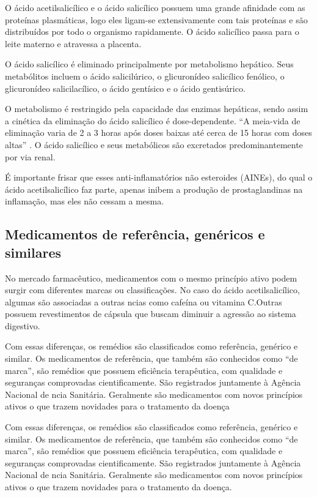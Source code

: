 O ácido acetilsalicílico e o ácido salicílico possuem uma grande afinidade com as proteínas plasmáticas,
logo eles ligam-se extensivamente com tais proteínas e são distribuídos por todo o organismo rapidamente.
O ácido salicílico passa para o leite materno e atravessa a placenta.

O ácido salicílico é eliminado principalmente por metabolismo hepático. Seus metabólitos incluem o ácido
salicilúrico, o glicuronídeo salicílico fenólico, o glicuronídeo salicilacílico, o ácido gentísico e o
ácido gentisúrico.

O metabolismo é restringido pela capacidade das enzimas hepáticas, sendo assim a cinética da eliminação
do ácido salicílico é dose-dependente. “A meia-vida de eliminação varia de 2 a 3 horas após doses baixas
até cerca de 15 horas com doses altas” \cite{bulaaspirina}. O ácido salicílico e seus metabólicos são
excretados predominantemente por via renal. 

É importante frisar que esses anti-inflamatórios não esteroides (AINEs), do qual o ácido acetilsalicílico
faz parte, apenas inibem a produção de prostaglandinas na inflamação, mas eles não cessam a mesma.

\subsection{Medicamentos de referência, genéricos e similares}\label{refgensim}

No mercado farmacêutico, medicamentos com o mesmo princípio ativo podem surgir com diferentes marcas ou
classificações. No caso do ácido acetilsalicílico, algumas são associadas a outras ncias como cafeína ou
vitamina C.Outras possuem revestimentos de cápsula que buscam diminuir a agressão ao sistema digestivo.
\cite{prade2006}

Com essas diferenças, os remédios são classificados como referência, genérico e similar. Os medicamentos
de referência, que também são conhecidos como “de marca”, são remédios que possuem eficiência
terapêutica, com qualidade e seguranças comprovadas cientificamente. São registrados juntamente à Agência
Nacional de ncia Sanitária. Geralmente são medicamentos com novos princípios ativos o que trazem
novidades para o tratamento da doença

Com essas diferenças, os remédios são classificados como referência, genérico e similar. Os medicamentos
de referência, que também são conhecidos como “de marca”, são remédios que possuem eficiência
terapêutica, com qualidade e seguranças comprovadas cientificamente. São registrados juntamente à Agência
Nacional de ncia Sanitária. Geralmente são medicamentos com novos princípios ativos o que trazem
novidades para o tratamento da doença.

